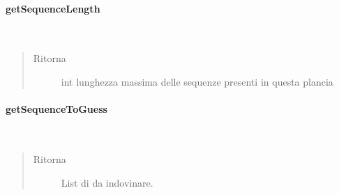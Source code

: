 \documentclass[letterpaper,10pt,italian,openany,oneside]{sphinxmanual}
\begin{document}
\paragraph{getSequenceLength}
\label{\detokenize{test/it/unicam/cs/pa/mastermind/gamecore/BoardModel:getsequencelength}}

\begin{fulllineitems}
\label{\detokenize{test/it/unicam/cs/pa/mastermind/gamecore/BoardModel:it.unicam.cs.pa.mastermind.gamecore.BoardModel.getSequenceLength()}}~\begin{quote}\begin{description}
\item[{Ritorna}] \leavevmode
int lunghezza massima delle sequenze presenti in questa plancia

\end{description}\end{quote}

\end{fulllineitems}



\paragraph{getSequenceToGuess}
\label{\detokenize{test/it/unicam/cs/pa/mastermind/gamecore/BoardModel:getsequencetoguess}}

\begin{fulllineitems}
\label{\detokenize{test/it/unicam/cs/pa/mastermind/gamecore/BoardModel:it.unicam.cs.pa.mastermind.gamecore.BoardModel.getSequenceToGuess()}}~\begin{quote}\begin{description}
\item[{Ritorna}] \leavevmode
List di  da indovinare.

\end{description}\end{quote}

\end{fulllineitems}
\end{document}
